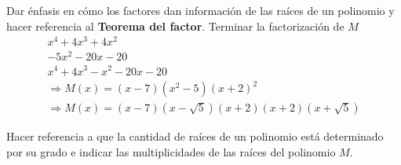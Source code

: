 Dar énfasis en cómo los factores dan información de las raíces de un polinomio y hacer referencia al \textbf{Teorema del factor}.
\newpage
Terminar la factorización de $M$
\begin{align*}
    x^4 + 4x^3 + 4x^2\hspace{5em}\\
    -5x^2 - 20x - 20\\
    x^4 + 4x^3 - x^2 - 20x - 20\\
    \Rightarrow M(x) = (x - 7)(x^2 - 5)(x + 2)^2\\
    \Rightarrow M(x) = (x - 7)(x - \sqrt{5})(x + 2)(x + 2)(x + \sqrt{5})
\end{align*}

Hacer referencia a que la cantidad de raíces de un polinomio está determinado por su grado e indicar las multiplicidades de las raíces del polinomio $M$.